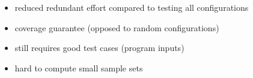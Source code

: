 \begin{frame}{\insertsubsection}
{{\begin{itemize}
				\item reduced redundant effort compared to testing all configurations
				\item coverage guarantee (opposed to random configurations)
				\item still requires good test cases (program inputs)
				\item hard to compute small sample sets
			\end{itemize}
		}
	}
\end{frame}

\newcommand{\pair}[2]{$#1 \wedge #2$ & $#1 \wedge \neg #2$ & $\neg #1 \wedge #2$ & $\neg #1 \wedge \neg #2$\\}
\newcommand{\redandgray}[1]{\only<#1-| handout:#1->{\color{black}}\only<#1| handout:#1>{\color{blue}}}
\newcommand{\epair}[6]{
	{\redandgray{#3}$#1 \wedge #2$} & 
	{\redandgray{#4}$#1 \wedge \neg #2$} & 
	{\redandgray{#5}$\neg #1 \wedge #2$} & 
	{\redandgray{#6}$\neg #1 \wedge \neg #2$}\\
}

